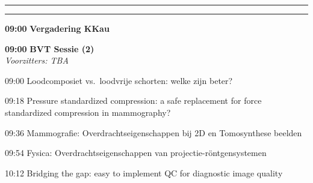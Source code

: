 \documentclass[a4paper,10pt]{report}
\begin{document}
\begin{multicols*}{3}

\vfill


\columnbreak

\hrule\vspace{2mm}
\vspace{2mm}\hrule\strut


\begin{packed_enum}
\item[\textbf{09:00}] \textbf{Vergadering KKau}
\end{packed_enum} %

\vfill

\begin{packed_enum}
\item[\textbf{09:00}] \textbf{BVT Sessie (2)}\\\textit{Voorzitters: TBA}
\item[09:00] Loodcomposiet vs.\ loodvrije schorten: welke zijn beter? 
\item[09:18] Pressure standardized compression: a safe replacement for force standardized compression in mammography? 
\item[09:36] Mammografie: Overdrachtseigenschappen bij 2D en Tomosynthese beelden 
\item[09:54] Fysica: Overdrachtseigenschappen van projectie-rönt\-gen\-systemen
\item[10:12] Bridging the gap: easy to implement QC for diagnostic image quality 
\end{packed_enum} %

\vfill


\end{multicols*}
\end{document}
